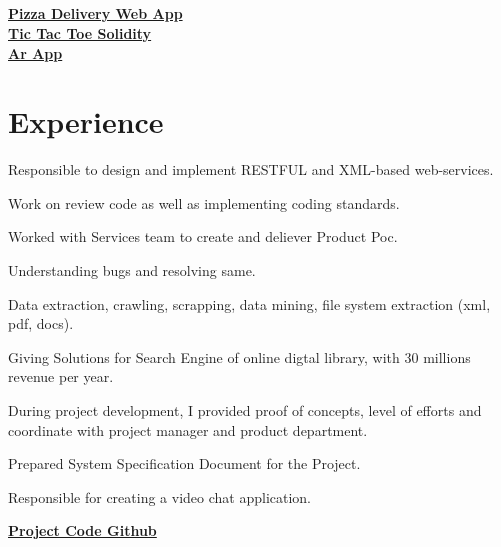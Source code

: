 \documentclass[]{deedy-resume-openfont}
\begin{document}
\begin{minipage}[t]{0.33\textwidth}
\subsection{}
 \href{https://github.com/karshil2309/Pizza_delivery_WebApp}{\bf Pizza Delivery Web App}\\
\href{https://github.com/karshil2309/BlockhainTask_Quillhash}{\bf Tic Tac Toe Solidity}\\ 
\href{https://github.com/karshil2309/ArCoreAdornAr Core Adorn }{\bf Ar App }
\sectionsep


%
%

\end{minipage} 
\hfill
\begin{minipage}[t]{0.66\textwidth} 


\section{Experience}
\vspace{\topsep} %
\begin{tightemize}
\item Responsible to design and implement RESTFUL and XML-based web-services.
\item Work on review code as well as implementing coding standards. 
\item Worked with Services team to create and deliever Product Poc.
\item Understanding bugs and resolving same.
\item Data extraction, crawling, scrapping, data mining, file system extraction (xml, pdf, docs).
\item Giving Solutions for Search Engine of  online digtal library, with 30 millions revenue per year. 
\item During project development, I provided proof of concepts, level of efforts and coordinate with project manager and product department.
\end{tightemize}
\sectionsep

\vspace{\topsep} %
\begin{tightemize}
\item Prepared System Specification Document for the Project.
\item Responsible for creating a video chat application.
\item \href{https://github.com/karshil2309/Webrtc_Android_login}{\bf Project Code Github}
\end{tightemize}
\sectionsep


\end{minipage}
\end{document}

